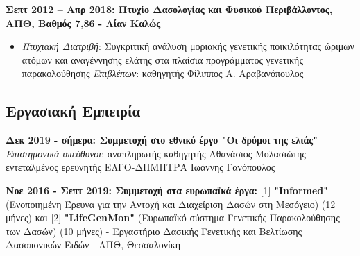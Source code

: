 \documentclass[12pt,]{scrartcl}
\begin{document}
\textbf{Σεπτ 2012 -- Απρ 2018: Πτυχίο Δασολογίας και Φυσικού Περιβάλλοντος, ΑΠΘ, Βαθμός 7,86 - Λίαν Καλώς}
\begin{itemize}
\setlength\itemsep{-0.5em}
\item \textit{Πτυχιακή Διατριβή}: Συγκριτική ανάλυση μοριακής γενετικής ποικιλότητας
ώριμων ατόμων και αναγέννησης ελάτης στα πλαίσια
προγράμματος γενετικής παρακολούθησης
\vspace{1mm}
\newline
\textit{Επιβλέπων}: καθηγητής Φίλιππος Α. Αραβανόπουλος
\end{itemize}

\vspace{-3mm}

\subsection{Εργασιακή Εμπειρία}\label{Εμπειρία}
\vspace{-3mm}



\textbf{Δεκ 2019 - σήμερα: Συμμετοχή στο εθνικό έργο "Οι δρόμοι της ελιάς"}
\vspace{2mm}
\newline
\textit{Επιστημονικά υπεύθυνοι}: αναπληρωτής καθηγητής Αθανάσιος Μολασιώτης
\newline 
\phantom{1} \hspace{3.7 cm} εντεταλμένος ερευνητής ΕΛΓΟ-ΔΗΜΗΤΡΑ Ιωάννης Γανόπουλος

\textbf{Νοε 2016 - Σεπτ 2019: Συμμετοχή στα ευρωπαϊκά έργα:} [1] \textbf{"Informed"} (Ενοποιημένη Έρευνα για την Αντοχή και Διαχείριση Δασών στη Μεσόγειο) (12 μήνες) και [2] \textbf{"LifeGenMon"} (Ευρωπαϊκό σύστημα Γενετικής Παρακολούθησης των Δασών) (10 μήνες) - Εργαστήριο Δασικής Γενετικής και Βελτίωσης Δασοπονικών Ειδών - ΑΠΘ, Θεσσαλονίκη 
\end{document}
